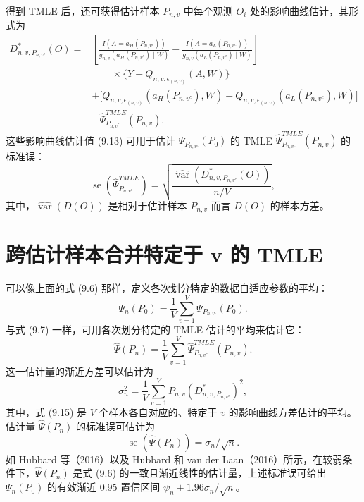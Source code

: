 得到 TMLE 后，还可获得估计样本 $P_{n,v}$ 中每个观测 $O_i$ 处的影响曲线估计，其形式为
\begin{equation}
\begin{aligned}
D^*_{n,v,P_{n,v^c}}(O)
={}&\left[\frac{I(A=a_H(P_{n,v^c}))}{g_{n,v}(a_H(P_{n,v^c})\mid W)}
-\frac{I(A=a_L(P_{n,v^c}))}{g_{n,v}(a_L(P_{n,v^c})\mid W)}\right]\\
&\qquad\times\{Y-Q_{n,v,\epsilon_{(n,v)}}(A,W)\}\\
&+\bigl[Q_{n,v,\epsilon_{(n,v)}}(a_H(P_{n,v^c}),W)
-Q_{n,v,\epsilon_{(n,v)}}(a_L(P_{n,v^c}),W)\bigr]\\
&-\hat\Psi^{TMLE}_{P_{n,v^c}}(P_{n,v}).
\end{aligned}
\tag{9.13}
\end{equation}
这些影响曲线估计值 (9.13) 可用于估计 $\Psi_{P_{n,v^c}}(P_0)$ 的 TMLE $\hat\Psi^{TMLE}_{P_{n,v^c}}(P_{n,v})$ 的标准误：
\[
\operatorname{se}(\hat\Psi^{TMLE}_{P_{n,v^c}})
=\sqrt{\frac{\widehat{\operatorname{var}}(D^*_{n,v,P_{n,v^c}}(O))}{n/V}},
\]
其中，$\widehat{\operatorname{var}}(D(O))$ 是相对于估计样本 $P_{n,v}$ 而言 $D(O)$ 的样本方差。

\section{跨估计样本合并特定于 v 的 TMLE}

可以像上面的式 (9.6) 那样，定义各次划分特定的数据自适应参数的平均：
\[
\Psi_n(P_0)=\frac1V\sum_{v=1}^V\Psi_{P_{n,v^c}}(P_0).
\]
与式 (9.7) 一样，可用各次划分特定的 TMLE 估计的平均来估计它：
\begin{equation}
\hat\Psi(P_n)=\frac1V\sum_{v=1}^V\hat\Psi^{TMLE}_{P_{n,v^c}}(P_{n,v}).
\tag{9.14}
\end{equation}
这一估计量的渐近方差可以估计为
\begin{equation}
\sigma_n^2=\frac1V\sum_{v=1}^V P_{n,v}(D^*_{n,v,P_{n,v^c}})^2,
\tag{9.15}
\end{equation}
其中，式 (9.15) 是 $V$ 个样本各自对应的、特定于 $v$ 的影响曲线方差估计的平均。估计量 $\hat\Psi(P_n)$ 的标准误可估计为
\[
\operatorname{se}(\hat\Psi(P_n))=\sigma_n/\sqrt n.
\]
如 Hubbard 等（2016）以及 Hubbard 和 van der Laan（2016）所示，在较弱条件下，$\hat\Psi(P_n)$ 是式 (9.6) 的一致且渐近线性的估计量，上述标准误可给出 $\Psi_n(P_0)$ 的有效渐近 0.95 置信区间 $\psi_n\pm1.96\sigma_n/\sqrt n$。

